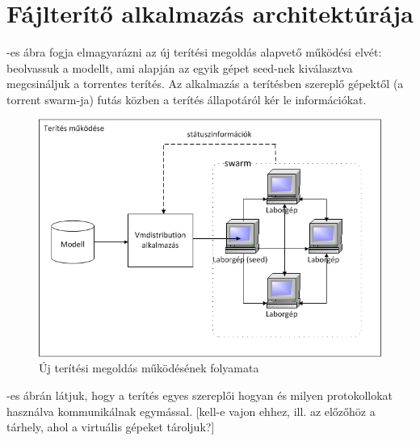 \\
\indent {}\\
\indent \indent {}\\
\indent \indent \indent	{}\\
\indent \indent \indent	{}\\
\indent \indent \indent \indent	{}


\section{Fájlterítő alkalmazás architektúrája}
\label{design_apparchi}

-es ábra fogja elmagyarázni az új terítési megoldás alapvető működési elvét: beolvassuk a modellt, ami alapján az egyik gépet seed-nek kiválasztva megcsináljuk a torrentes terítés. Az alkalmazás a terítésben szereplő gépektől (a torrent swarm-ja) futás közben a terítés állapotáról kér le információkat.

\begin{figure}[ht]
	\centering
	\includegraphics[width=130mm, keepaspectratio]{figures/design_overview.png}
	\caption{Új terítési megoldás működésének folyamata}
	\label{fig:designoverview}
\end{figure}

-es ábrán látjuk, hogy a terítés egyes szereplői hogyan és milyen protokollokat használva kommunikálnak egymással. [kell-e vajon ehhez, ill. az előzőhöz a tárhely, ahol a virtuális gépeket tároljuk?]

